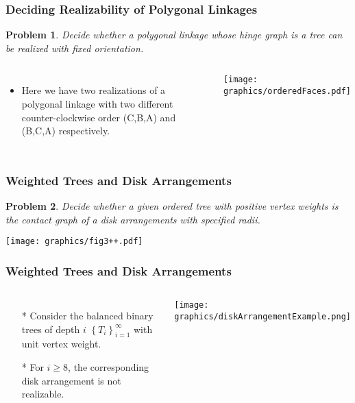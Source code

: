 \documentclass{beamer}
\newtheorem{prob}{Problem}
\begin{document}
\begin{frame}
\frametitle{Deciding Realizability of Polygonal Linkages}
\begin{prob}
Decide whether a polygonal linkage whose hinge graph is a \textit{tree} can be realized with \textit{fixed orientation}.
\end{prob}
\begin{columns}[c] 
   \begin{itemize}
    \item Here we have two realizations of a polygonal linkage with two different counter-clockwise order (C,B,A) and (B,C,A) respectively.  
   \end{itemize}
    \begin{minipage}{\linewidth}
        \begin{center}
			\texttt{[image: graphics/orderedFaces.pdf]}
		\end{center}
    \end{minipage}
  \end{columns}
\end{frame}

\begin{frame}
\frametitle{Weighted Trees and Disk Arrangements}
\begin{prob}
Decide whether a given ordered tree with positive vertex weights is the contact graph of a disk arrangements with specified radii.
\end{prob}
\begin{minipage}{\linewidth}
        \begin{center}
            \texttt{[image: graphics/fig3++.pdf]}
        \end{center} 
    \end{minipage}

\end{frame}

\begin{frame}\frametitle{Weighted Trees and Disk Arrangements}
    \begin{columns}[c] %
   \begin{itemize}
    \item[*] Consider the balanced binary trees of depth $i$ $\left\lbrace T_i \right\rbrace_{i=1}^\infty$ with unit vertex weight.
    \item[*] For $i \geq 8$, the corresponding disk arrangement is not realizable.
   \end{itemize}
    \begin{minipage}{\linewidth}
        \begin{center}
        \texttt{[image: graphics/diskArrangementExample.png]}
        \end{center}
    \end{minipage}
  \end{columns}
\end{frame}
\end{document}
